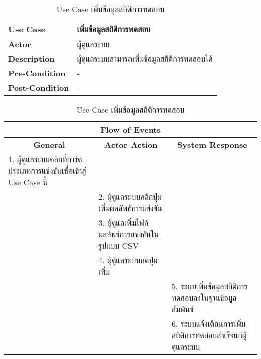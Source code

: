 \begin{table}[H]
    \caption{Use Case เพิ่มข้อมูลสถิติการทดสอบ}
    \label{tab:usecase-import-stats}
    \begin{tabularx}{\textwidth}{ | p{3cm} | X | }
    \hline
    \textbf{Use Case} & เพิ่มข้อมูลสถิติการทดสอบ \\
    \hline
    \textbf{Actor} & ผู้ดูแลระบบ \\
    \hline
    \textbf{Description} & ผู้ดูแลระบบสามารถเพิ่มข้อมูลสถิติการทดสอบได้ \\
    \hline
    \textbf{Pre-Condition} & - \\
    \hline
    \textbf{Post-Condition} & - \\
    \hline
    \end{tabularx}
    \begin{tabularx}{\textwidth}{ | X | X | X | }
    \multicolumn{3}{|c|}{\textbf{Flow of Events}} \\
    \hline
    \multicolumn{1}{|c|}{\textbf{General}} & \multicolumn{1}{|c|}{\textbf{Actor Action}} & \multicolumn{1}{|c|}{\textbf{System Response}} \\
    \hline
    1. ผู้ดูแลระบบคลิกที่การ์ดประเภทการแข่งขันเพื่อเข้าสู่ Use Case นี้ &  &  \\
    \hline
    & 2. ผู้ดูแลระบบคลิกปุ่มเพิ่มผลลัพธ์การแข่งขัน  &  \\
    \hline
    & 3. ผู้ดูแลเพิ่มไฟล์ผลลัพธ์การแข่งขันในรูปแบบ CSV  &  \\
    \hline
    & 4. ผู้ดูแลระบบกดปุ่มเพิ่ม &  \\
    \hline
    & & 5. ระบบเพิ่มข้อมูลสถิติการทดสอบลงในฐานข้อมูลสัมพันธ์ \\
    \hline
    & & 6. ระบบแจ้งเตือนการเพิ่มสถิติการทดสอบสำเร็จแก่ผู้ดูแลระบบ \\
    \hline
    \end{tabularx}
\end{table}
